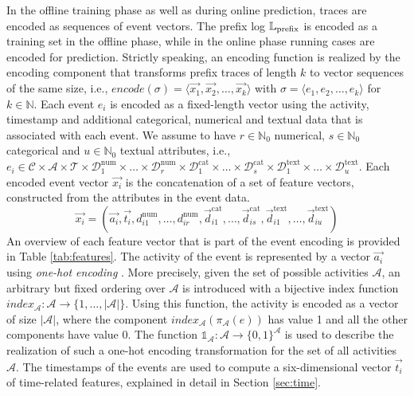 In the offline training phase as well as during online prediction, traces are encoded as sequences of event vectors.
The prefix log $\mathbb{L}_\mathrm{prefix}$ is encoded as a training set in the offline phase, while in the online phase running cases are encoded for prediction.
Strictly speaking, an encoding function is realized by the encoding component that transforms prefix traces of length $k$ to vector sequences of the same size, i.e., $encode(\sigma) = \langle \vec{x_1}, \vec{x_2}, \dots, \vec{x_k}\rangle$ with $\sigma = \langle e_1, e_2, \dots, e_k\rangle$ for $k \in \mathbb{N}$.
Each event $e_i$ is encoded as a fixed-length vector using the activity, timestamp and additional categorical, numerical and textual data that is associated with each event.
We assume to have $r \in \mathbb{N}_0$ numerical, $s \in \mathbb{N}_0$ categorical and $u \in \mathbb{N}_0$ textual attributes, i.e., $e_i \in \mathcal{C} \times \mathcal{A}  \times \mathcal{T} \times \mathcal{D}_1^\mathrm{num} \times \dots \times \mathcal{D}_r^\mathrm{num}   \times \mathcal{D}_1^\mathrm{cat}  \times  \dots  \times \mathcal{D}_s^\mathrm{cat}   \times \mathcal{D}_1^\mathrm{text}   \times \dots  \times \mathcal{D}_u^\mathrm{text}$.
Each encoded event vector $\vec{x_i}$ is the concatenation of a set of feature vectors, constructed from the attributes in the event data.
\begin{equation*}
\vec{x_i}=(
\vec{a_i},
\vec{t_i},
d_{i1}^\mathrm{num}, \dots, d_{ir}^\mathrm{num},
\vec{d}_{i1}^\mathrm{cat}, \dots,\vec{d}_{is}^\mathrm{cat},
\vec{d}_{i1}^\mathrm{text}, \dots, \vec{d}_{iu}^\mathrm{text})
\end{equation*}
An overview of each feature vector that is part of the event encoding is provided in Table \ref{tab:features}.
The activity of the event is represented by a vector $\vec{a_i}$ using \textit{one-hot encoding} \cite{garavaglia1998smart}.
More precisely, given the set of possible activities $\mathcal{A}$, an arbitrary but fixed ordering over $\mathcal{A}$ is introduced with a bijective index function $index_\mathcal{A} \colon \mathcal{A} \to \{1, \dots, |\mathcal{A}|\}$.
Using this function, the activity is encoded as a vector of size $|\mathcal{A}|$, where the component $index_\mathcal{A}(\pi_\mathcal{A}(e))$ has value 1 and all the other components have value 0.
The function $\mathds{1}_\mathcal{A}\colon \mathcal{A} \to \{0,1\}^\mathcal{A}$ is used to describe the realization of such a one-hot encoding transformation for the set of all activities $\mathcal{A}$.
The timestamps of the events are used to compute a six-dimensional vector $\vec{t_i}$ of time-related features, explained in detail in Section \ref*{sec:time}.

